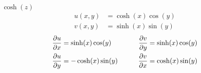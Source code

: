 \item[7.] $\cosh(z)$
\begin{align*}
    u(x,y) &= \cosh(x)\cos(y)\\
    v(x,y) &= \sinh(x)\sin(y)
\end{align*}
\begin{align*}
    \frac{\partial u}{\partial x}  &= \sinh(x)\cos(y)  &\qquad \frac{\partial v}{\partial y}  &= \sinh(x)\cos(y) \\
    \frac{\partial u}{\partial y}  &= -\cosh(x)\sin(y)  &\qquad \frac{\partial v}{\partial x}  &= \cosh(x)\sin(y) 
\end{align*}
